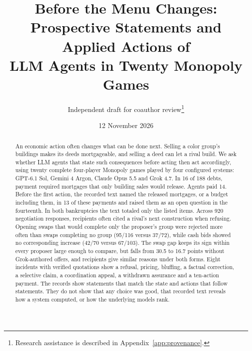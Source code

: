 \documentclass[11pt,letterpaper]{article}
\title{Before the Menu Changes:\\Prospective Statements and Applied Actions of\\LLM Agents in Twenty Monopoly Games}
\author{Independent draft for coauthor review\thanks{Research assistance is described in Appendix~\ref{app:provenance}.}}
\date{12 November 2026}
\begin{document}

\maketitle
\begin{abstract}
An economic action often changes what can be done next. Selling a color group's buildings makes its deeds mortgageable, and selling a deed can let a rival build. We ask whether LLM agents that state such consequences before acting then act accordingly, using twenty complete four-player Monopoly games played by four configured systems: GPT-6.1 Sol, Gemini 4 Argon, Claude Opus 5.5 and Grok 4.7. In 16 of 188 debts, payment required mortgages that only building sales would release. Agents paid 14. Before the first action, the recorded text named the released mortgages, or a budget including them, in 13 of these payments and raised them as an open question in the fourteenth. In both bankruptcies the text totaled only the listed items. Across 920 negotiation responses, recipients often cited a rival's next construction when refusing. Opening swaps that would complete only the proposer's group were rejected more often than swaps completing no group (95/116 versus 37/72), while cash bids showed no corresponding increase (42/70 versus 67/103). The swap gap keeps its sign within every proposer large enough to compare, but falls from 30.5 to 16.7 points without Grok-authored offers, and recipients give similar reasons under both forms. Eight incidents with verified quotations show a refusal, pricing, bluffing, a factual correction, a selective claim, a coordination appeal, a withdrawn assurance and a ten-action payment. The records show statements that match the state and actions that follow statements. They do not show that any choice was good, that recorded text reveals how a system computed, or how the underlying models rank.
\end{abstract}






\begingroup\small\setlength{\bibsep}{0pt}

\endgroup
\clearpage\appendix

\end{document}
